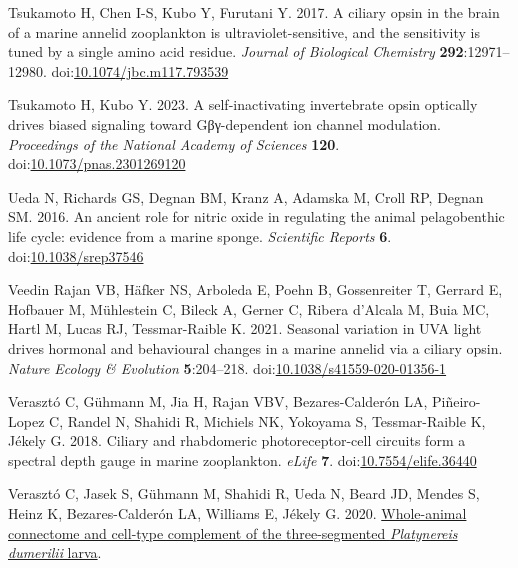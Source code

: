 \documentclass[
  10pt,
  onecolumn]{article}
\newlength{\cslhangindent}
\newlength{\cslentryspacingunit} %
\newenvironment{CSLReferences}[2] %
 {%
  \setlength{\parindent}{0pt}
  \ifodd #1
  \let\oldpar\par
  \def\par{\hangindent=\cslhangindent\oldpar}
  \fi
  \setlength{\parskip}{#2\cslentryspacingunit}
 }%
 {}
\begin{document}
\begin{CSLReferences}{1}{0}
\leavevmode{}%
Tsukamoto H, Chen I-S, Kubo Y, Furutani Y. 2017. A ciliary opsin in the
brain of a marine annelid zooplankton is ultraviolet-sensitive, and the
sensitivity is tuned by a single amino acid residue. \emph{Journal of
Biological Chemistry} \textbf{292}:12971--12980.
doi:\href{https://doi.org/10.1074/jbc.m117.793539}{10.1074/jbc.m117.793539}

\leavevmode{}%
Tsukamoto H, Kubo Y. 2023. A self-inactivating invertebrate opsin
optically drives biased signaling toward Gβγ-dependent ion channel
modulation. \emph{Proceedings of the National Academy of Sciences}
\textbf{120}.
doi:\href{https://doi.org/10.1073/pnas.2301269120}{10.1073/pnas.2301269120}

\leavevmode{}%
Ueda N, Richards GS, Degnan BM, Kranz A, Adamska M, Croll RP, Degnan SM.
2016. An ancient role for nitric oxide in regulating the animal
pelagobenthic life cycle: evidence from a marine sponge.
\emph{Scientific Reports} \textbf{6}.
doi:\href{https://doi.org/10.1038/srep37546}{10.1038/srep37546}

\leavevmode{}%
Veedin Rajan VB, Häfker NS, Arboleda E, Poehn B, Gossenreiter T, Gerrard
E, Hofbauer M, Mühlestein C, Bileck A, Gerner C, Ribera d'Alcala M, Buia
MC, Hartl M, Lucas RJ, Tessmar-Raible K. 2021. Seasonal variation in UVA
light drives hormonal and behavioural changes in a marine annelid via a
ciliary opsin. \emph{Nature Ecology \& Evolution} \textbf{5}:204--218.
doi:\href{https://doi.org/10.1038/s41559-020-01356-1}{10.1038/s41559-020-01356-1}

\leavevmode{}%
Verasztó C, Gühmann M, Jia H, Rajan VBV, Bezares-Calderón LA,
Piñeiro-Lopez C, Randel N, Shahidi R, Michiels NK, Yokoyama S,
Tessmar-Raible K, Jékely G. 2018. Ciliary and rhabdomeric
photoreceptor-cell circuits form a spectral depth gauge in marine
zooplankton. \emph{eLife} \textbf{7}.
doi:\href{https://doi.org/10.7554/elife.36440}{10.7554/elife.36440}

\leavevmode{}%
Verasztó C, Jasek S, Gühmann M, Shahidi R, Ueda N, Beard JD, Mendes S,
Heinz K, Bezares-Calderón LA, Williams E, Jékely G. 2020.
\href{http://dx.doi.org/10.1101/2020.08.21.260984}{Whole-animal
connectome and cell-type complement of the three-segmented
{\emph{Platynereis dumerilii}} larva}.


\end{CSLReferences}
\end{document}
